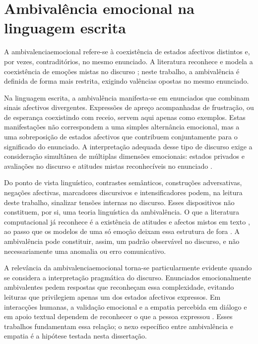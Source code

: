 
\section{Ambivalência emocional na linguagem escrita}
\label{sec:ambivalencia}

A \gls{ambivalenciaemocional} refere-se à coexistência de estados afectivos distintos e, por vezes, contraditórios, no mesmo enunciado. A literatura reconhece e modela a coexistência de emoções mistas no discurso \parencite{Wiebe2005Opinions, Zhao2026MEGE, Singh2026MultiEmotionIntensity}; neste trabalho, a ambivalência é definida de forma mais restrita, exigindo valências opostas no mesmo enunciado.

Na linguagem escrita, a ambivalência manifesta-se em enunciados que combinam sinais afectivos divergentes. Expressões de apreço acompanhadas de frustração, ou de esperança coexistindo com receio, servem aqui apenas como exemplos. Estas manifestações não correspondem a uma simples alternância emocional, mas a uma sobreposição de estados afectivos que contribuem conjuntamente para o significado do enunciado. A interpretação adequada desse tipo de discurso exige a consideração simultânea de múltiplas dimensões emocionais: estados privados e avaliações no discurso \parencite{Wiebe2005Opinions} e atitudes mistas reconhecíveis no enunciado \parencite{Neviarouskaya2010Affect}.

Do ponto de vista linguístico, contrastes semânticos, construções adversativas, negações afectivas, marcadores discursivos e intensificadores podem, na leitura deste trabalho, sinalizar tensões internas no discurso. Esses dispositivos não constituem, por si, uma teoria linguística da ambivalência. O que a literatura computacional já reconhece é a existência de atitudes e afectos mistos em texto \parencite{Neviarouskaya2010Affect}, ao passo que os modelos de uma só emoção deixam essa estrutura de fora \parencite{Singh2026MultiEmotionIntensity, PlazaDelArco2024Trends}. A ambivalência pode constituir, assim, um padrão observável no discurso, e não necessariamente uma anomalia ou erro comunicativo.

A relevância da \gls{ambivalenciaemocional} torna-se particularmente evidente quando se considera a interpretação pragmática do discurso. Enunciados emocionalmente ambivalentes pedem respostas que reconheçam essa complexidade, evitando leituras que privilegiem apenas um dos estados afectivos expressos. Em interacções humanas, a validação emocional e a empatia percebida em diálogo e em apoio textual dependem de reconhecer o que a pessoa expressou \parencite{Son2026EmotionalValidation, Sharma2020Empathy, Rashkin2019Empathy}. Esses trabalhos fundamentam essa relação; o nexo específico entre ambivalência e empatia é a hipótese testada nesta dissertação.

